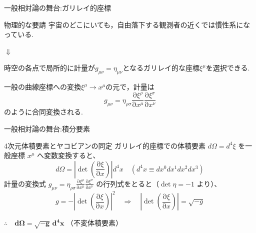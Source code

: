 \documentclass[unicode, aspectratio=169, 12pt]{beamer}
\newcommand{\pdiff}[2]{\frac{\mathrm{\partial} #1}{\mathrm{\partial} #2}} %
\begin{document}
\begin{frame}{一般相対論の舞台:ガリレイ的座標}
    \begin{block}{物理的な要請}
        宇宙のどこにいても，自由落下する観測者の近くでは慣性系になっている.
        \begin{center}
            $\Downarrow$
        \end{center}
        時空の各点で局所的に計量が$g_{\mu\nu} = \eta_{\mu\nu}$となるガリレイ的な座標$\xi^\mu$を選択できる.
    \end{block}
    一般の曲線座標への変換$\xi^\mu\to x^\mu$の元で，計量は
    \begin{equation*}
        g_{\mu\nu} = \eta_{\rho\sigma}\pdiff{\xi^\rho}{x^\mu}\pdiff{\xi^\sigma}{x^\nu}
    \end{equation*}
    のように合同変換される.
\end{frame}

\begin{frame}{一般相対論の舞台:積分要素}
    \begin{block}{4次元体積要素とヤコビアンの同定}
        ガリレイ的座標での体積要素 $d\Omega = d^4\xi$ を一般座標 $x^\mu$ へ変数変換すると、
        \begin{equation*}
            d\Omega = \left| \det\left(\pdiff{\xi}{x}\right) \right| d^4x \quad (d^4x \equiv dx^0 dx^1 dx^2 dx^3)
        \end{equation*}
        計量の変換式 $g_{\mu\nu} = \eta_{\rho\sigma} \pdiff{\xi^\rho}{x^\mu} \pdiff{\xi^\sigma}{x^\nu}$ の行列式をとると（$\det\eta = -1$ より）、
        \begin{equation*}
            g = - \left| \det\left(\pdiff{\xi}{x}\right) \right|^2
            \quad \Longrightarrow \quad
            \left| \det\left(\pdiff{\xi}{x}\right) \right| = \sqrt{-g}
        \end{equation*}
    \end{block}

    \vspace{0.6em}
    \centering
    \large
    $\therefore \quad \bm{d\Omega = \sqrt{-g} \, d^4x}$ \normalsize \quad （不変体積要素）
\end{frame}
\end{document}
